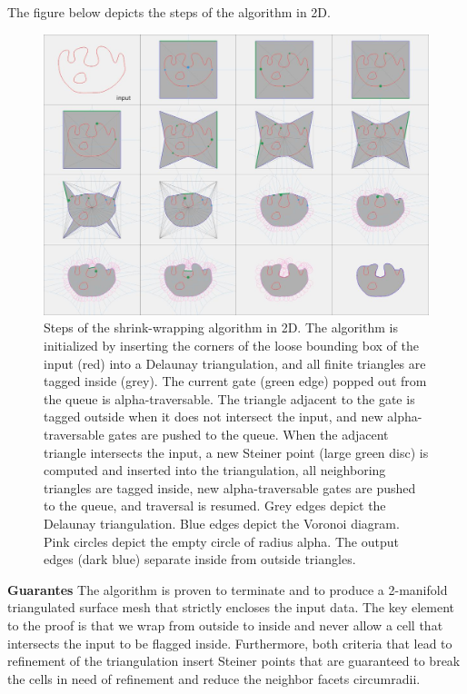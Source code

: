 \documentclass[12pt]{article}
\begin{document}
The figure below depicts the steps of the algorithm in 2D.
\begin{figure}[H]
    \centering
        \centering
        \includegraphics[width=\textwidth]{images/aw3_steps.jpg}
        \caption{Steps of the shrink-wrapping algorithm in 2D. The algorithm is initialized by
        inserting the corners of the loose bounding box of the input (red) into a Delaunay
        triangulation, and all finite triangles are tagged inside (grey). The current gate
        (green edge) popped out from the queue is alpha-traversable. The triangle adjacent
        to the gate is tagged outside when it does not intersect the input, and new
        alpha-traversable gates are pushed to the queue. When the adjacent triangle
        intersects the input, a new Steiner point (large green disc) is computed and inserted
        into the triangulation, all neighboring triangles are tagged inside, new
        alpha-traversable gates are pushed to the queue, and traversal is resumed. Grey edges
        depict the Delaunay triangulation. Blue edges depict the Voronoi diagram. Pink circles
        depict the empty circle of radius alpha. The output edges (dark blue) separate inside
        from outside triangles.
        }
\end{figure}

\textbf{Guarantes}
The algorithm is proven to terminate and to produce a 2-manifold triangulated surface 
mesh that strictly encloses the input data. The key element to the proof is that we wrap 
from outside to inside and never allow a cell that intersects the input to be flagged 
inside. Furthermore, both criteria that lead to refinement of the triangulation insert
 Steiner points that are guaranteed to break the cells in need of refinement and
 reduce the neighbor facets circumradii.
\end{document}
